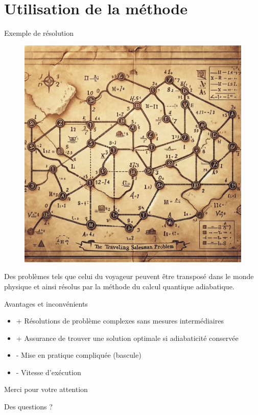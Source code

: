 \documentclass{beamer}
\begin{document}
\section{Utilisation de la méthode}
\begin{frame}{Exemple de résolution}
    \begin{figure}
        \centering
        \includegraphics[scale=0.1]{rsc/voy.png}
        \label{fig:salesman}
    \end{figure}

Des problèmes tels que celui du voyageur peuvent être transposé dans le monde physique et ainsi résolus par la méthode du calcul quantique adiabatique.
\end{frame}

\begin{frame}{Avantages et inconvénients}
    \begin{itemize}
        \item + Résolutions de problème complexes sans mesures intermédiaires
        \item + Assurance de trouver une solution optimale si adiabaticité conservée
        \item - Mise en pratique compliquée (bascule)
        \item - Vitesse d'exécution
    \end{itemize}
\end{frame}

\begin{frame}
\Huge{\centerline{Merci pour votre attention}}
\Large{\centerline{Des questions ?}}
\end{frame}
\end{document}

